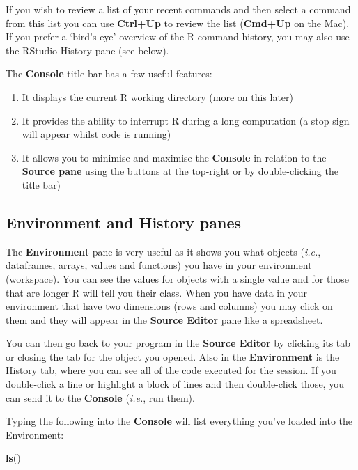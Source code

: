 \documentclass[
]{book}
\newenvironment{Shaded}{\begin{snugshade}}{\end{snugshade}}
\newcommand{\KeywordTok}[1]{\textcolor[rgb]{0.13,0.29,0.53}{\textbf{#1}}}
\newcommand{\NormalTok}[1]{#1}
\begin{document}
If you wish to review a list of your recent commands and then select a command from this list you can use \textbf{Ctrl+Up} to review the list (\textbf{Cmd+Up} on the Mac). If you prefer a `bird's eye' overview of the R command history, you may also use the RStudio History pane (see below).

The \textbf{Console} title bar has a few useful features:

\begin{enumerate}
\def\labelenumi{\arabic{enumi}.}
\item
  It displays the current R working directory (more on this later)
\item
  It provides the ability to interrupt R during a long computation (a stop sign will appear whilst code is running)
\item
  It allows you to minimise and maximise the \textbf{Console} in relation to the \textbf{Source pane} using the buttons at the top-right or by double-clicking the title bar)
\end{enumerate}

\hypertarget{environment-and-history-panes}{%
\subsection{Environment and History panes}\label{environment-and-history-panes}}

The \textbf{Environment} pane is very useful as it shows you what objects (\emph{i.e.}, dataframes, arrays, values and functions) you have in your environment (workspace). You can see the values for objects with a single value and for those that are longer R will tell you their class. When you have data in your environment that have two dimensions (rows and columns) you may click on them and they will appear in the \textbf{Source Editor} pane like a spreadsheet.

You can then go back to your program in the \textbf{Source Editor} by clicking its tab or closing the tab for the object you opened. Also in the \textbf{Environment} is the History tab, where you can see all of the code executed for the session. If you double-click a line or highlight a block of lines and then double-click those, you can send it to the \textbf{Console} (\emph{i.e.}, run them).

Typing the following into the \textbf{Console} will list everything you've loaded into the Environment:

\begin{Shaded}
\begin{Highlighting}[]
\KeywordTok{ls}\NormalTok{()}
\end{Highlighting}
\end{Shaded}
\end{document}
